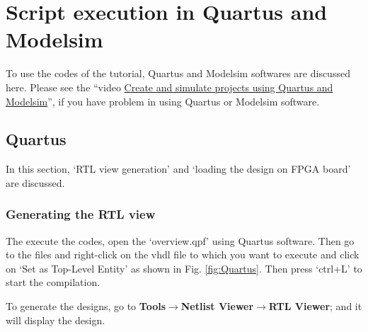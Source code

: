 \chapter{Script execution in Quartus and Modelsim}\label{QuartusModelsim}

\graphicspath{{Chapters/Overview/Figures/}}

To use the codes of the tutorial, Quartus and Modelsim softwares are discussed here. Please see the ``video \href{https://www.youtube.com/playlist?list=PLpqu8JfoNKiNJpFvKTeBlI-LMzc2TAlRM}{Create and simulate projects using Quartus and Modelsim}'', if you have problem in using  Quartus or Modelsim software. 

\section{Quartus}
In this section, `RTL view generation' and `loading the design on FPGA board' are discussed. 

\subsection{Generating the RTL view}
The execute the codes, open the `overview.qpf' using Quartus software. Then go to the files and right-click on the vhdl file to which you want to execute and click on `Set as Top-Level Entity' as shown in Fig. \ref{fig:Quartus}. Then press `ctrl+L' to start the compilation. 

To generate the designs, go to \textbf{Tools$\rightarrow$Netlist Viewer$\rightarrow$RTL Viewer}; and it will display the design. 

